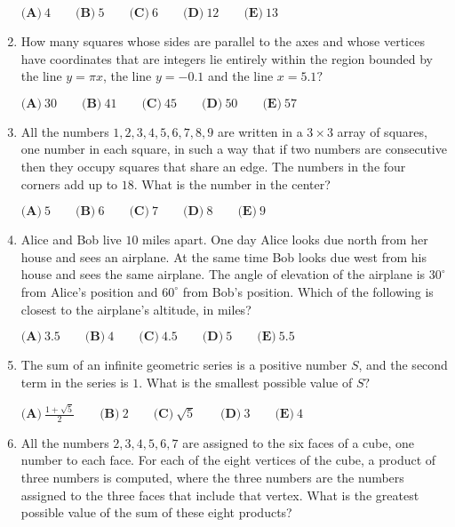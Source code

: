 \documentclass{article}
\begin{document}
\begin{enumerate}[label=\arabic*., itemsep=0.5em]
\(\textbf{(A)}\ 4 \qquad\textbf{(B)}\ 5 \qquad\textbf{(C)}\ 6 \qquad\textbf{(D)}\ 12  \qquad\textbf{(E)}\ 13\)\par \vspace{0.5em}\item How many squares whose sides are parallel to the axes and whose vertices have coordinates that are integers lie entirely within the region bounded by the line \(y=\pi x\), the line \(y=-0.1\) and the line \(x=5.1?\)

\(\textbf{(A)}\ 30 \qquad
\textbf{(B)}\ 41 \qquad
\textbf{(C)}\ 45 \qquad
\textbf{(D)}\ 50 \qquad
\textbf{(E)}\ 57\)\par \vspace{0.5em}\item All the numbers \(1, 2, 3, 4, 5, 6, 7, 8, 9\) are written in a \(3\times3\) array of squares, one number in each square, in such a way that if two numbers are consecutive then they occupy squares that share an edge. The numbers in the four corners add up to \(18\). What is the number in the center?

\(\textbf{(A)}\ 5\qquad\textbf{(B)}\ 6\qquad\textbf{(C)}\ 7\qquad\textbf{(D)}\ 8\qquad\textbf{(E)}\ 9\)\par \vspace{0.5em}\item Alice and Bob live \(10\) miles apart. One day Alice looks due north from her house and sees an airplane. At the same time Bob looks due west from his house and sees the same airplane. The angle of elevation of the airplane is \(30^\circ\) from Alice's position and \(60^\circ\) from Bob's position. Which of the following is closest to the airplane's altitude, in miles?

\(\textbf{(A)}\ 3.5 \qquad\textbf{(B)}\ 4 \qquad\textbf{(C)}\ 4.5 \qquad\textbf{(D)}\ 5 \qquad\textbf{(E)}\ 5.5\)\par \vspace{0.5em}\item The sum of an infinite geometric series is a positive number \(S\), and the second term in the series is \(1\). What is the smallest possible value of \(S?\)

\(\textbf{(A)}\ \frac{1+\sqrt{5}}{2} \qquad
\textbf{(B)}\ 2 \qquad
\textbf{(C)}\ \sqrt{5} \qquad
\textbf{(D)}\ 3 \qquad
\textbf{(E)}\ 4\)\par \vspace{0.5em}\item All the numbers \(2, 3, 4, 5, 6, 7\) are assigned to the six faces of a cube, one number to each face. For each of the eight vertices of the cube, a product of three numbers is computed, where the three numbers are the numbers assigned to the three faces that include that vertex. What is the greatest possible value of the sum of these eight products?


\end{enumerate}
\end{document}

